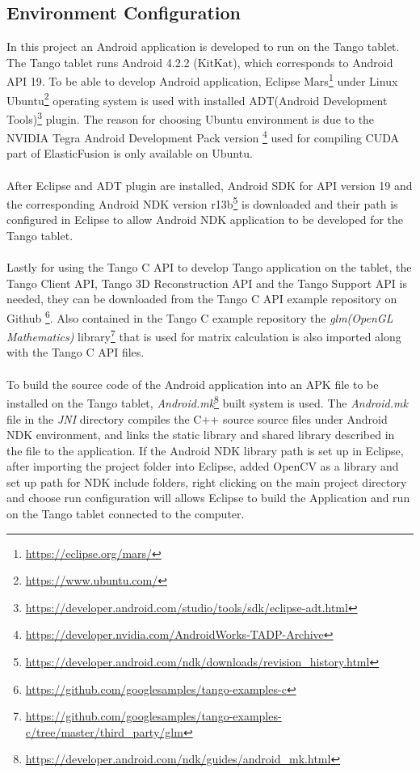\documentclass[12pt,twoside]{article}
\begin{document}
\subsection{Environment Configuration}
In this project an Android application is developed to run on the Tango tablet. The Tango tablet runs Android 4.2.2 (KitKat), which corresponds to Android API 19. To be able to develop Android application, Eclipse Mars\footnote{\url{https://eclipse.org/mars/}} under Linux Ubuntu\footnote{\url{https://www.ubuntu.com/}} operating system is used with installed ADT(Android Development Tools)\footnote{\url{https://developer.android.com/studio/tools/sdk/eclipse-adt.html}} plugin. The reason for choosing Ubuntu environment is due to the NVIDIA Tegra Android Development Pack version \footnote{\url{https://developer.nvidia.com/AndroidWorks-TADP-Archive}} used for compiling CUDA part of ElasticFusion is only available on Ubuntu.\\
\\
After Eclipse and ADT plugin are installed, Android SDK for API version 19 and the corresponding Android NDK version r13b\footnote{\url{https://developer.android.com/ndk/downloads/revision_history.html}} is downloaded and their path is configured in Eclipse to allow Android NDK application to be developed for the Tango tablet.\\
\\
Lastly for using the Tango C API to develop Tango application on the tablet, the Tango Client API, Tango 3D Reconstruction API and the Tango Support API is needed, they can be downloaded from the Tango C API example repository on Github \footnote{\url{https://github.com/googlesamples/tango-examples-c}}. Also contained in the Tango C example repository the \textit{glm(OpenGL Mathematics)} library\footnote{\url{https://github.com/googlesamples/tango-examples-c/tree/master/third_party/glm}} that is used for matrix calculation is also imported along with the Tango C API files.\\
\\
To build the source code of the Android application into an APK file to be installed on the Tango tablet, \textit{Android.mk}\footnote{\url{https://developer.android.com/ndk/guides/android_mk.html}} built system is used. The \textit{Android.mk} file in the \textit{JNI} directory compiles the C++ source source files under Android NDK environment, and links the static library and shared library described in the file to the application. If the Android NDK library path is set up in Eclipse, after importing the project folder into Eclipse, added OpenCV as a library and set up path for NDK include folders, right clicking on the main project directory and choose run configuration will allows Eclipse to build the Application and run on the Tango tablet connected to the computer.\\
\end{document}

